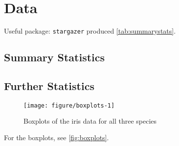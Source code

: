 \newpage
\section{Data}
\label{sec:Data}
\blindtext[1]

Useful package: \texttt{stargazer} produced \vref{tab:summarystats}.
\subsection{Summary Statistics}
\label{sub:Stats}
\blindtext
\begin{kframe}


{\ttfamily\noindent\bfseries{}}\end{kframe}
\blindtext[3]

\subsection{Further Statistics}
\blindtext
\begin{knitrout}
\color{fgcolor}\begin{figure}

{\centering \texttt{[image: figure/boxplots-1]} 

}

\caption[Boxplots of the iris data for all three species]{Boxplots of the iris data for all three species}\label{fig:boxplots}
\end{figure}


\end{knitrout}
\blindtext[4]

For the boxplots, see \vref{fig:boxplots}.

